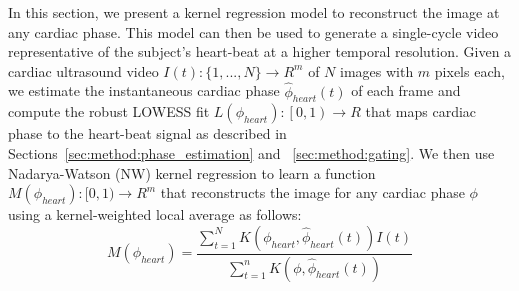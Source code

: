 \documentclass[journal]{IEEEtran}
\begin{document}
%
In this section, we present a kernel regression model to reconstruct the image at any cardiac phase. This model can then be used to generate a single-cycle video representative of the subject's heart-beat at a higher temporal resolution. Given a cardiac ultrasound video $I(t) : \{1, ..., N\} \to R^m$ of $N$ images with $m$ pixels each, we estimate the instantaneous cardiac phase $\hat{\phi}_{heart}(t)$ of each frame and compute the robust LOWESS fit $L(\phi_{heart}) : \left [  0, 1\right ) \to R$ that maps cardiac phase to the heart-beat signal as described in Sections~\ref{sec:method:phase_estimation} and ~\ref{sec:method:gating}. We then use Nadarya-Watson (NW) kernel regression \cite{Bishop2006} to learn a function $M(\phi_{heart}): [0, 1) \to R^m $ that reconstructs the image for any cardiac phase $\phi$ using a kernel-weighted local average as follows:
\begin{equation}
M(\phi_{heart}) = \frac{\sum_{t = 1}^{N} K \left( \phi_{heart}, \hat{\phi}_{heart}(t) \right) I(t)}{\sum_{t = 1}^{n} K \left( \phi, \hat{\phi}_{heart}(t) \right)} 
\end{equation}
\end{document}
